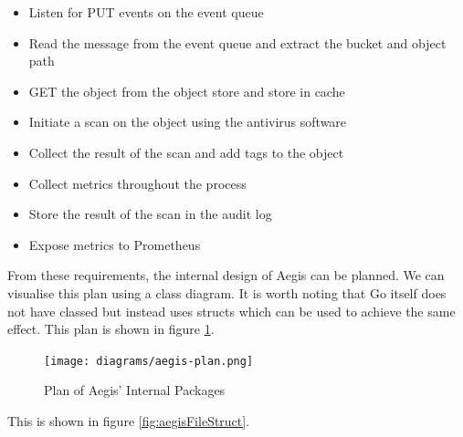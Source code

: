 \documentclass[12pt, conference, final, a4paper, onecolumn, compsoc]{IEEEtran}
\begin{document}
\begin{itemize}
  \item Listen for PUT events on the event queue
  \item Read the message from the event queue and extract the bucket and object
        path
  \item GET the object from the object store and store in cache
  \item Initiate a scan on the object using the antivirus software
  \item Collect the result of the scan and add tags to the object
  \item Collect metrics throughout the process
  \item Store the result of the scan in the audit log
  \item Expose metrics to Prometheus
\end{itemize}

From these requirements, the internal design of Aegis can be planned. We can
visualise this plan using a class diagram. It is worth noting that Go itself
does not have classed but instead uses structs which can be used to achieve
the same effect. This plan is shown in figure \ref{fig:aegisPlan}.

\begin{figure}
  \centering \texttt{[image: diagrams/aegis-plan.png]}
  \caption{Plan of Aegis' Internal Packages}
  \label{fig:aegisPlan}
\end{figure}

This is shown in figure \ref{fig:aegisFileStruct}.
\end{document}
